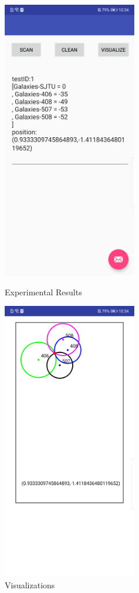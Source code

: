 \documentclass[12pt, a4paper]{article}
\theoremstyle{definition}
\begin{document}
\begin{figure}[htbp]
	\begin{minipage}[t]{0.5\linewidth}
		\centering
		\includegraphics[width=2.3in]{3.jpeg}
		\caption{Experimental Results}
		\label{fig3}
		\end{minipage}%
		\begin{minipage}[t]{0.5\linewidth}
		\centering
		\includegraphics[width=2.3in]{4.jpeg}
		\caption{Visualizations}
		\label{fig4}
		\end{minipage}
\end{figure}
\end{document}
